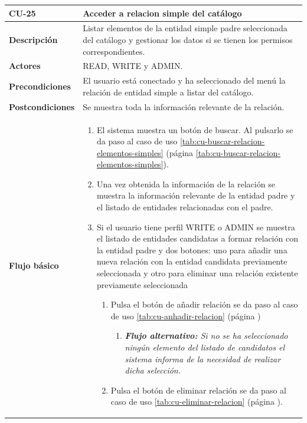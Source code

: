 \begin{table} [H]
    \centering
    \setlength{\leftmargini}{0.4cm}
	\resizebox{14cm}{!} { %
    \begin{tabular}{| m{3cm} | m{11cm} |}   
    \hline
	  \textbf{CU-25} & \textbf{Acceder a relacion simple del catálogo} \\\hline
	  \textbf{Descripción} & Listar elementos de la entidad simple padre seleccionada del catálogo y gestionar los datos si se tienen los permisos correspondientes. \\\hline
	  \textbf{Actores} & READ, WRITE y ADMIN. \\\hline
	  \textbf{Precondiciones} & El usuario está conectado y ha seleccionado del menú la relación de entidad simple a listar del catálogo. \\\hline
	  \textbf{Postcondiciones} & Se muestra toda la información relevante de la relación. \\\hline
	  \textbf{Flujo básico} & 
		\begin{enumerate}
	  	\item El sistema muestra un botón de buscar. Al pulsarlo se da paso al caso de uso \ref{tab:cu-buscar-relacion-elementos-simples} (página \ref{tab:cu-buscar-relacion-elementos-simples}).
	  	\item Una vez obtenida la información de la relación se muestra la información relevante de la entidad padre y el listado de entidades relacionadas con el padre.
	  	\item Si el usuario tiene perfil WRITE o ADMIN se muestra el listado de entidades candidatas a formar relación con la entidad padre y dos botones: uno para añadir una nueva relación con la entidad candidata previamente seleccionada y otro para eliminar una relación existente previamente seleccionada
	  	\begin{enumerate}
		        \item Pulsa el botón de añadir relación se da paso al caso de uso \ref{tab:cu-anhadir-relacion} (página \pageref{tab:cu-anhadir-relacion})
					\begin{enumerate}	
			   		\item  \textit{\textbf{Flujo alternativo:} Si no se ha seleccionado ningún elemento del listado de candidatos el sistema informa de la necesidad de realizar dicha selección.}
			   		\end{enumerate}		
		        \item Pulsa el botón de eliminar relación se da paso al caso de uso \ref{tab:cu-eliminar-relacion} (página \pageref{tab:cu-eliminar-relacion}).

\end{enumerate}
\end{enumerate}
\end{tabular}}
\end{table}
